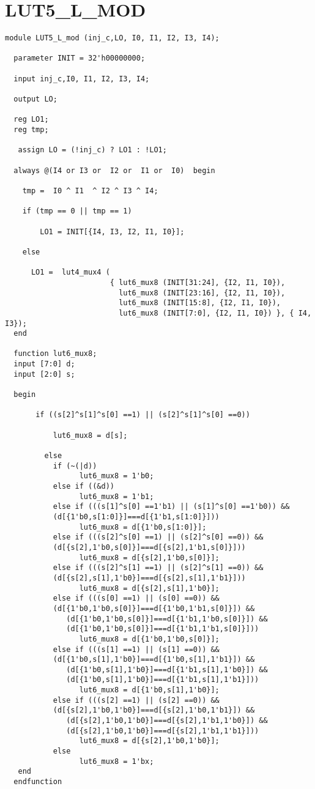 \section{LUT5\_L\_MOD}
\begin{lstlisting}
module LUT5_L_mod (inj_c,LO, I0, I1, I2, I3, I4);

  parameter INIT = 32'h00000000;

  input inj_c,I0, I1, I2, I3, I4;

  output LO;

  reg LO1;
  reg tmp;
  
   assign LO = (!inj_c) ? LO1 : !LO1;

  always @(I4 or I3 or  I2 or  I1 or  I0)  begin
 
    tmp =  I0 ^ I1  ^ I2 ^ I3 ^ I4;

    if (tmp == 0 || tmp == 1)

        LO1 = INIT[{I4, I3, I2, I1, I0}];

    else 
    
      LO1 =  lut4_mux4 (
                        { lut6_mux8 (INIT[31:24], {I2, I1, I0}),
                          lut6_mux8 (INIT[23:16], {I2, I1, I0}),
                          lut6_mux8 (INIT[15:8], {I2, I1, I0}),
                          lut6_mux8 (INIT[7:0], {I2, I1, I0}) }, { I4, I3});
  end

  function lut6_mux8;
  input [7:0] d;
  input [2:0] s;
   
  begin

       if ((s[2]^s[1]^s[0] ==1) || (s[2]^s[1]^s[0] ==0))
           
           lut6_mux8 = d[s];

         else
           if (~(|d))
                 lut6_mux8 = 1'b0;
           else if ((&d))
                 lut6_mux8 = 1'b1;
           else if (((s[1]^s[0] ==1'b1) || (s[1]^s[0] ==1'b0)) &&
           (d[{1'b0,s[1:0]}]===d[{1'b1,s[1:0]}]))
                 lut6_mux8 = d[{1'b0,s[1:0]}];
           else if (((s[2]^s[0] ==1) || (s[2]^s[0] ==0)) && 
           (d[{s[2],1'b0,s[0]}]===d[{s[2],1'b1,s[0]}]))
                 lut6_mux8 = d[{s[2],1'b0,s[0]}];
           else if (((s[2]^s[1] ==1) || (s[2]^s[1] ==0)) && 
           (d[{s[2],s[1],1'b0}]===d[{s[2],s[1],1'b1}]))
                 lut6_mux8 = d[{s[2],s[1],1'b0}];
           else if (((s[0] ==1) || (s[0] ==0)) &&
           (d[{1'b0,1'b0,s[0]}]===d[{1'b0,1'b1,s[0]}]) &&
              (d[{1'b0,1'b0,s[0]}]===d[{1'b1,1'b0,s[0]}]) && 
              (d[{1'b0,1'b0,s[0]}]===d[{1'b1,1'b1,s[0]}]))
                 lut6_mux8 = d[{1'b0,1'b0,s[0]}];
           else if (((s[1] ==1) || (s[1] ==0)) &&
           (d[{1'b0,s[1],1'b0}]===d[{1'b0,s[1],1'b1}]) &&
              (d[{1'b0,s[1],1'b0}]===d[{1'b1,s[1],1'b0}]) &&
              (d[{1'b0,s[1],1'b0}]===d[{1'b1,s[1],1'b1}]))
                 lut6_mux8 = d[{1'b0,s[1],1'b0}];
           else if (((s[2] ==1) || (s[2] ==0)) && 
           (d[{s[2],1'b0,1'b0}]===d[{s[2],1'b0,1'b1}]) &&
              (d[{s[2],1'b0,1'b0}]===d[{s[2],1'b1,1'b0}]) &&
              (d[{s[2],1'b0,1'b0}]===d[{s[2],1'b1,1'b1}]))
                 lut6_mux8 = d[{s[2],1'b0,1'b0}];
           else
                 lut6_mux8 = 1'bx;
   end
  endfunction



\end{lstlisting}
